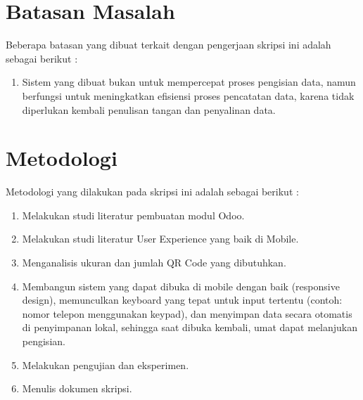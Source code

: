 \section{Batasan Masalah}
\label{sec:batasan}
Beberapa batasan yang dibuat terkait dengan pengerjaan skripsi ini adalah sebagai berikut :
\begin{enumerate}
	\item Sistem yang dibuat bukan untuk mempercepat proses pengisian data, namun berfungsi untuk meningkatkan efisiensi proses pencatatan data, karena tidak diperlukan kembali penulisan tangan dan penyalinan data.
\end{enumerate}


\section{Metodologi}
\label{sec:metlit}
Metodologi yang dilakukan pada skripsi ini adalah sebagai berikut :
\begin{enumerate}
	\item Melakukan studi literatur pembuatan modul Odoo.
	\item Melakukan studi literatur User Experience yang baik di Mobile.
	\item Menganalisis ukuran dan jumlah QR Code yang dibutuhkan.
	\item Membangun sistem yang dapat dibuka di mobile dengan baik (responsive design), memunculkan keyboard yang tepat untuk input tertentu (contoh: nomor telepon menggunakan keypad), dan menyimpan data secara otomatis di penyimpanan lokal, sehingga saat dibuka kembali, umat dapat melanjukan pengisian.
	\item Melakukan pengujian dan eksperimen.
	\item Menulis dokumen skripsi.
\end{enumerate}


